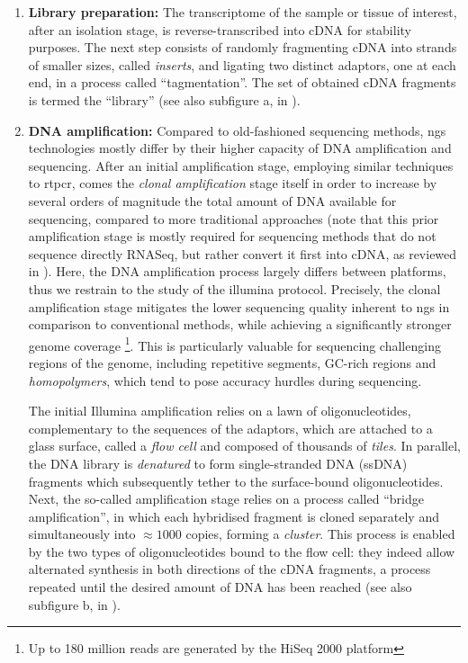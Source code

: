 \begin{enumerate}[label=(\roman*)]
    \item \textbf{Library preparation:} The transcriptome of the sample or tissue of interest, after an isolation stage, is reverse-transcribed into \gls{cDNA} for stability purposes. The next step consists of randomly fragmenting cDNA into strands of smaller sizes, called \emph{inserts}, and ligating two distinct adaptors, one at each end, in a process called \enquote{tagmentation}. The set of obtained cDNA fragments is termed the \enquote{library} (see also subfigure a, in ).
    
    \item \textbf{DNA amplification:} Compared to old-fashioned sequencing methods, \acrshort{ngs} technologies mostly differ by their higher capacity of DNA amplification and sequencing. After an initial amplification stage, employing similar techniques to \acrfull{rtpcr}, comes the \emph{clonal amplification} stage itself in order to increase by several orders of magnitude the total amount of DNA available for sequencing, compared to more traditional approaches (note that this prior amplification stage is mostly required for sequencing methods that do not sequence directly RNASeq, but rather convert it first into cDNA, as reviewed in ). Here, the DNA amplification process largely differs between platforms, thus we restrain to the study of the \Gls{illumina} protocol. Precisely, the clonal amplification stage mitigates the lower sequencing quality inherent to \acrshort{ngs} in comparison to conventional methods, while achieving a significantly stronger genome coverage \footnote{Up to 180 million reads are generated by the HiSeq 2000 platform}. This is particularly valuable for sequencing challenging regions of the genome, including repetitive segments, GC-rich regions and \emph{homopolymers}, which tend to pose accuracy hurdles during sequencing.
    
    The initial Illumina amplification relies on a lawn of oligonucleotides, complementary to the sequences of the adaptors, which are attached to a glass surface, called a \emph{flow cell} and composed of thousands of \emph{tiles}. In parallel, the DNA library is \emph{denatured} to form single-stranded DNA (ssDNA) fragments which subsequently tether to the surface-bound oligonucleotides.
     Next, the so-called amplification stage relies on a process called \enquote{bridge amplification}, in which each hybridised fragment is cloned separately and simultaneously into $\approx 1000$ copies, forming a \emph{cluster}. This process is enabled by the two types of oligonucleotides bound to the flow cell: they indeed allow alternated synthesis in both directions of the cDNA fragments, a process repeated until the desired amount of DNA has been reached (see also subfigure b, in ). 
    

\end{enumerate}
